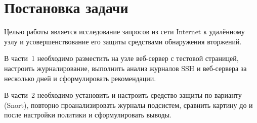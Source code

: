 \section{Постановка задачи}
\label{sec:task}

Целью работы является исследование запросов из сети Internet к удалённому узлу и усовершенствование его защиты средствами обнаружения вторжений.

В части~1 необходимо разместить на узле веб-сервер с тестовой страницей, настроить журналирование, выполнить анализ журналов SSH и веб-сервера за несколько дней и сформулировать рекомендации.

В части~2 необходимо установить и настроить средство защиты по варианту (Snort), повторно проанализировать журналы подсистем, сравнить картину до и после настройки политики и сформулировать выводы.
